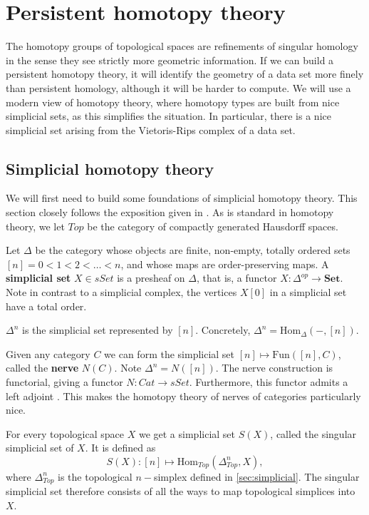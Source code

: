 \section{Persistent homotopy theory}
The homotopy groups of topological spaces are refinements of singular homology in the sense they see strictly more geometric information. If we can build a persistent homotopy theory, it will identify the geometry of a data set more finely than persistent homology, although it will be harder to compute. We will use a modern view of homotopy theory, where homotopy types are built from nice simplicial sets, as this simplifies the situation. In particular, there is a nice simplicial set arising from the Vietoris-Rips complex of a data set.

\subsection{Simplicial homotopy theory} We will first need to build some foundations of simplicial homotopy theory. This section closely follows the exposition given in \cite{Land}. As is standard in homotopy theory, we let $Top$ be the category of compactly generated Hausdorff spaces.

Let $\Delta$ be the category whose objects are finite, non-empty, totally ordered sets $[n]=0<1<2<\dots<n$, and whose maps are order-preserving maps. A \textbf{simplicial set} $X\in sSet$ is a presheaf on $\Delta$, that is, a functor $X:\Delta^{op}\rightarrow \textbf{Set}$. Note in contrast to a simplicial complex, the vertices $X[0]$ in a simplicial set have a total order.
\begin{example}
    $\Delta^n$ is the simplicial set represented by $[n].$ Concretely, $\Delta^n=\text{Hom}_\Delta(-,[n])$.
\end{example}

\begin{example}
    Given any category $C$ we can form the simplicial set $[n]\mapsto \text{Fun}([n],C)$, called the \textbf{nerve} $N(C).$ Note $\Delta^n=N([n]).$ The nerve construction is functorial, giving a functor $N:Cat\rightarrow sSet$. Furthermore, this functor admits a left adjoint \cite{Land}. This makes the homotopy theory of nerves of categories particularly nice.
\end{example}

For every topological space $X$ we get a simplicial set $S(X)$, called the singular simplicial set of $X$. It is defined as
$$S(X):[n]\mapsto\text{Hom}_{Top}(\Delta^n_{Top},X),$$
where $\Delta^n_{Top}$ is the topological $n-$simplex defined in \ref{sec:simplicial}.
The singular simplicial set therefore consists of all the ways to map topological simplices into $X$.

